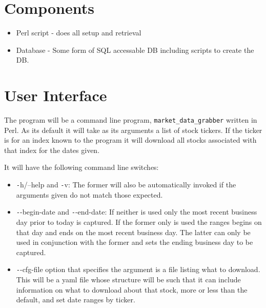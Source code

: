 \documentclass{report}
\begin{document}
\section{Components}

\begin{itemize}
    \item Perl script - does all setup and retrieval
    \item Database - Some form of SQL accessable DB including scripts to create
          the DB.
\end{itemize}

\section{User Interface}

The program will be a command line program, \texttt{market\_data\_grabber} written in
Perl.  As its default it will take as its arguments a list of stock tickers.  If the
ticker is for an index known to the program it will download all stocks associated
with that index for the dates given.

It will have the following command line switches:
\begin{itemize}
    \item {\texttt -h/--help} and {\texttt -v}: The former will also be automatically
        invoked if the arguments given do not match those expected.

    \item {\texttt --begin-date} and {\texttt --end-date}: If neither is used only 
        the most recent business day prior to today is captured.  If the former only
        is used the ranges begins on that day and ends on the most recent business
        day.  The latter can only be used in conjunction with the former and sets 
        the ending business day to be captured.

    \item {\texttt --cfg-file} option that specifies the argument is a file listing 
        what to download.  This will be a yaml file whose structure will be such that
        it can include information on what to download about that stock, more or less
        than the default, and set date ranges by ticker.
\end{itemize}
\end{document}
